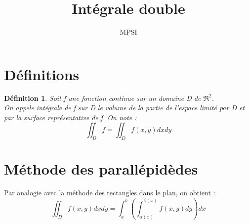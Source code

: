 \documentclass[a4paper,12 pt,oneside]{report}     %
\title{Intégrale double}
\author{MPSI}
\newtheorem{de}{Définition}
\begin{document}
\maketitle
\tableofcontents
\section{Définitions}
\begin{de}
Soit f une fonction continue sur un domaine D de $\Re^2$.\\
On appele intégrale de f sur D le volume de la partie de l'espace limité par D et par la surface représentative de f. On note :
$$\iint_D f = \iint_D f(x,y)dxdy$$
\end{de}
\section{Méthode des parallépidèdes}
Par analogie avec la méthode des rectangles dans le plan, on obtient : 
$$\iint_D f(x,y)dxdy = \int_a^b \left( \int_{\alpha(x)}^{\beta(x)} f(x,y)dy\right) dx$$
\end{document}
